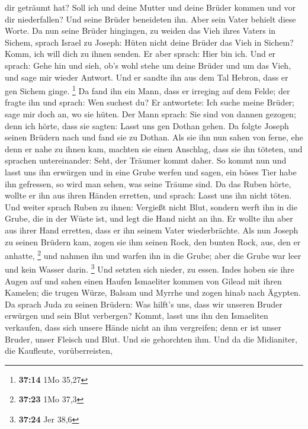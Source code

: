 dir geträumt hat? Soll ich und deine Mutter und deine Brüder kommen und
vor dir niederfallen?  Und seine Brüder beneideten ihn.
Aber sein Vater behielt diese Worte.  Da nun seine Brüder
hingingen, zu weiden das Vieh ihres Vaters in Sichem, 
sprach Israel zu Joseph: Hüten nicht deine Brüder das Vieh in Sichem?
Komm, ich will dich zu ihnen senden. Er aber sprach: Hier bin ich.
 Und er sprach: Gehe hin und sieh, ob's wohl stehe um
deine Brüder und um das Vieh, und sage mir wieder Antwort. Und er sandte
ihn aus dem Tal Hebron, dass er gen Sichem ginge. \footnote{\textbf{37:14}
  1Mo 35,27}  Da fand ihn ein Mann, dass er irreging auf
dem Felde; der fragte ihn und sprach: Wen suchest du?  Er
antwortete: Ich suche meine Brüder; sage mir doch an, wo sie hüten.
 Der Mann sprach: Sie sind von dannen gezogen; denn ich
hörte, dass sie sagten: Lasst uns gen Dothan gehen. Da folgte Joseph
seinen Brüdern nach und fand sie zu Dothan.  Als sie ihn
nun sahen von ferne, ehe denn er nahe zu ihnen kam, machten sie einen
Anschlag, dass sie ihn töteten,  und sprachen
untereinander: Seht, der Träumer kommt daher.  So kommt
nun und lasst uns ihn erwürgen und in eine Grube werfen und sagen, ein
böses Tier habe ihn gefressen, so wird man sehen, was seine Träume sind.
 Da das Ruben hörte, wollte er ihn aus ihren Händen
erretten, und sprach: Lasst uns ihn nicht töten.  Und
weiter sprach Ruben zu ihnen: Vergießt nicht Blut, sondern werft ihn in
die Grube, die in der Wüste ist, und legt die Hand nicht an ihn. Er
wollte ihn aber aus ihrer Hand erretten, dass er ihn seinem Vater
wiederbrächte.  Als nun Joseph zu seinen Brüdern kam,
zogen sie ihm seinen Rock, den bunten Rock, aus, den er anhatte,
\footnote{\textbf{37:23} 1Mo 37,3}  und nahmen ihn und
warfen ihn in die Grube; aber die Grube war leer und kein Wasser darin.
\footnote{\textbf{37:24} Jer 38,6}  Und setzten sich
nieder, zu essen. Indes hoben sie ihre Augen auf und sahen einen Haufen
Ismaeliter kommen von Gilead mit ihren Kamelen; die trugen Würze, Balsam
und Myrrhe und zogen hinab nach Ägypten.  Da sprach Juda
zu seinen Brüdern: Was hilft's uns, dass wir unseren Bruder erwürgen und
sein Blut verbergen?  Kommt, lasst uns ihn den Ismaeliten
verkaufen, dass sich unsere Hände nicht an ihm vergreifen; denn er ist
unser Bruder, unser Fleisch und Blut. Und sie gehorchten ihm.
 Und da die Midianiter, die Kaufleute, vorüberreisten,
